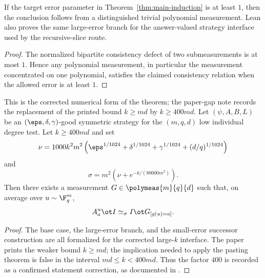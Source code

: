 \begin{lemma}\label{lem:main-induction-large-error}
	\leanok
	If the target error parameter in Theorem~\ref{thm:main-induction} is at least
	\(1\), then the conclusion follows from a distinguished trivial polynomial
	measurement.  Lean also proves the same large-error branch for the
	answer-valued strategy interface used by the recursive-slice route.
\end{lemma}
\begin{proof}
	\leanok
	The normalized bipartite consistency defect of two submeasurements is at most
	\(1\).  Hence any polynomial measurement, in particular the measurement
	concentrated on one polynomial, satisfies the claimed consistency relation when
	the allowed error is at least \(1\).
\end{proof}

\begin{theorem}\label{thm:main-induction}
	\leanok
	This is the corrected numerical form of the theorem; the paper-gap note
	\cite{gap:issue-906-main-formal-k-bound} records the
	replacement of the printed bound \(k \ge md\) by \(k \ge 400md\).
  Let $(\psi,A,B,L)$ be an $(\eps,\delta,\gamma)$-good symmetric strategy for the $(m,q,d)$ low individual degree test. Let $k \ge 400md$ and set
  \[
    \nu = 1000k^2m^2\left(\eps^{1/1024}+\delta^{1/1024}+\gamma^{1/1024}+(d/q)^{1/1024}\right)
  \]
  and
  \[
    \sigma = m^2\left(\nu + e^{-k/(80000m^2)}\right).
  \]
  Then there exists a measurement $G \in \polymeas{m}{q}{d}$ such that, on average over $u \sim \F_q^m$,
  \[
    A_a^u \ot I \simeq_\sigma I \ot G_{[g(u)=a]}.
  \]
\end{theorem}
\begin{proof}
	\leanok
	The base case, the large-error branch, and the small-error successor
	construction are all formalized for the corrected large-\(k\) interface.
	The paper prints the weaker bound \(k\ge md\); the implication needed to
	apply the pasting theorem is false in the interval \(md\le k<400md\).
	Thus the factor \(400\) is recorded as a confirmed statement correction, as
	documented in \cite{gap:issue-906-main-formal-k-bound}.
\end{proof}

